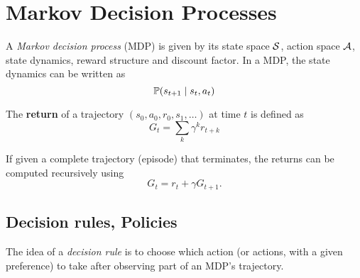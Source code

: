 \documentclass[../course-notes.tex]{subfiles}
\begin{document}
\chapter{Markov Decision Processes}


\begin{defn}
	A \emph{Markov decision process} (MDP) is given by its state space $\mathcal{S}$, action space $\mathcal{A}$, state dynamics, reward structure and discount factor. In a MDP, the state dynamics can be written as
	\[
		\mathbb{P}(s_{t+1} \mid s_t, a_t)
	\]
\end{defn}

The \textbf{\bluefont return} of a trajectory $(s_0,a_0,r_0,s_1,\ldots)$ at time $t$ is defined as
\begin{equation}
	G_t = \sum_{k} \gamma^k r_{t+k}
\end{equation}

If given a complete trajectory (episode) that terminates, the returns can be computed recursively using
\begin{equation}
	G_t = r_t + \gamma G_{t+1}.
\end{equation}



\section{Decision rules, Policies}

The idea of a \textit{decision rule} is to choose which action (or actions, with a given preference) to take after observing part of an MDP's trajectory.
\end{document}
